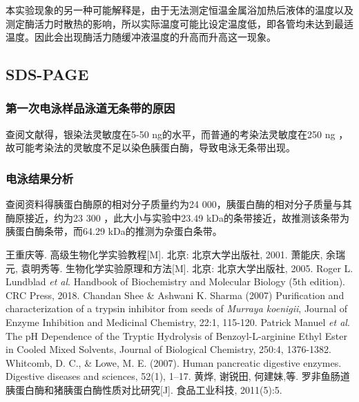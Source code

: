 \documentclass[11pt,UTF8]{ctexart}
\begin{document}
    本实验现象的另一种可能解释是，由于无法测定恒温金属浴加热后液体的温度以及测定酶活力时散热的影响，所以实际温度可能比设定温度低，即各管均未达到最适温度。因此会出现酶活力随缓冲液温度的升高而升高这一现象。    

    \subsection{SDS-PAGE}

    \subsubsection{第一次电泳样品泳道无条带的原因}
    查阅文献得，银染法灵敏度在5-50 ng的水平，而普通的考染法灵敏度在250 ng ，故可能考染法的灵敏度不足以染色胰蛋白酶，导致电泳无条带出现。
    
    \subsubsection{电泳结果分析}
    查阅资料得胰蛋白酶原的相对分子质量约为24 000，胰蛋白酶的相对分子质量与其酶原接近，约为23 300 ，此大小与实验中23.49 kDa的条带接近，故推测该条带为胰蛋白酶条带，而64.29 kDa的推测为杂蛋白条带。
    
    \begin{thebibliography}{99}  
         王重庆等. 高级生物化学实验教程[M]. 北京: 北京大学出版社, 2001.
         萧能庆, 余瑞元, 袁明秀等. 生物化学实验原理和方法[M]. 北京: 北京大学出版社, 2005. 
         Roger L. Lundblad \textit{et al}. Handbook of Biochemistry and Molecular Biology (5th edition). CRC Press, 2018.
         Chandan Shee & Ashwani K. Sharma (2007) Purification and characterization of a trypsin inhibitor from seeds of \textit{Murraya koenigii}, Journal of Enzyme Inhibition and Medicinal Chemistry, 22:1, 115-120.
         Patrick Manuel \textit{et al}. The pH Dependence of the Tryptic Hydrolysis of Benzoyl-L-arginine Ethyl Ester in Cooled Mixed Solvents, Journal of Biological Chemistry, 250:4, 1376-1382.
         Whitcomb, D. C., & Lowe, M. E. (2007). Human pancreatic digestive enzymes. Digestive diseases and sciences, 52(1), 1–17. 
         黄烨, 谢锐田, 何建妹,等. 罗非鱼肠道胰蛋白酶和猪胰蛋白酶性质对比研究[J]. 食品工业科技, 2011(5):5.
    \end{thebibliography}
    

    
\end{document}
